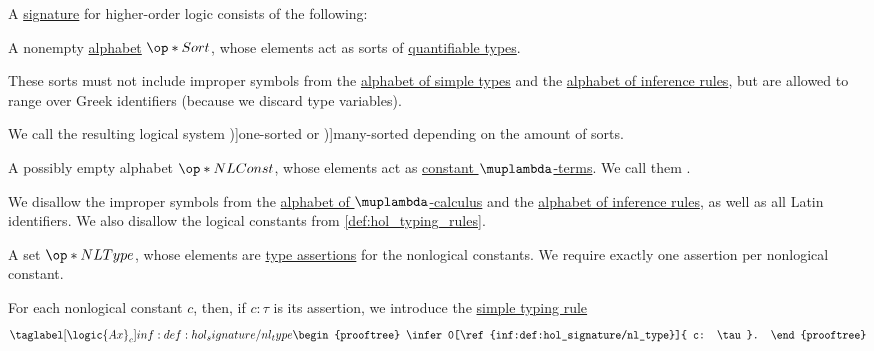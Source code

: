 \begin{definition}\label{def:hol_signature}\mimprovised
  A \hyperref[con:logical_system_signature]{signature} for higher-order logic consists of the following:
  \begin{thmenum}
     A nonempty \hyperref[def:formal_language/alphabet]{alphabet} \( \op*{Sort} \), whose elements act as sorts of \hyperref[def:quantifiable_type]{quantifiable types}.

    These sorts must not include improper symbols from the \hyperref[def:simple_type_alphabet]{alphabet of simple types} and the \hyperref[def:inference_rule_alphabet]{alphabet of inference rules}, but are allowed to range over Greek identifiers (because we discard type variables).

    We call the resulting logical system \term[en=one-sorted (predicate calculus) (\cite[84]{Kleene2002Logic})]{one-sorted} or \term[en=many-sorted predicate logic (\cite[\S 4.4.13]{TroelstraSchwichtenberg2000BasicProofTheory})]{many-sorted} depending on the amount of sorts.

     A possibly empty alphabet \( \op*{NLConst} \), whose elements act as \hyperref[def:lambda_term]{constant \( \muplambda \)-terms}. We call them .

    We disallow the improper symbols from the \hyperref[def:lambda_term_alphabet]{alphabet of \( \muplambda \)-calculus} and the \hyperref[def:inference_rule_alphabet]{alphabet of inference rules}, as well as all Latin identifiers. We also disallow the logical constants from \cref{def:hol_typing_rules}.

     A set \( \op*{NLType} \), whose elements are \hyperref[def:type_assertion]{type assertions} for the nonlogical constants. We require exactly one assertion per nonlogical constant.

    For each nonlogical constant \( c \), then, if \( c: \tau \) is its assertion, we introduce the \hyperref[def:simple_typing_rule]{simple typing rule}
    \begin{equation*}\taglabel[\ensuremath{ \logic{Ax}_c }]{inf:def:hol_signature/nl_type}
      \begin{prooftree}
        \infer0[\ref{inf:def:hol_signature/nl_type}]{ c: \tau }.
      \end{prooftree}
    \end{equation*}
  \end{thmenum}
\end{definition}
